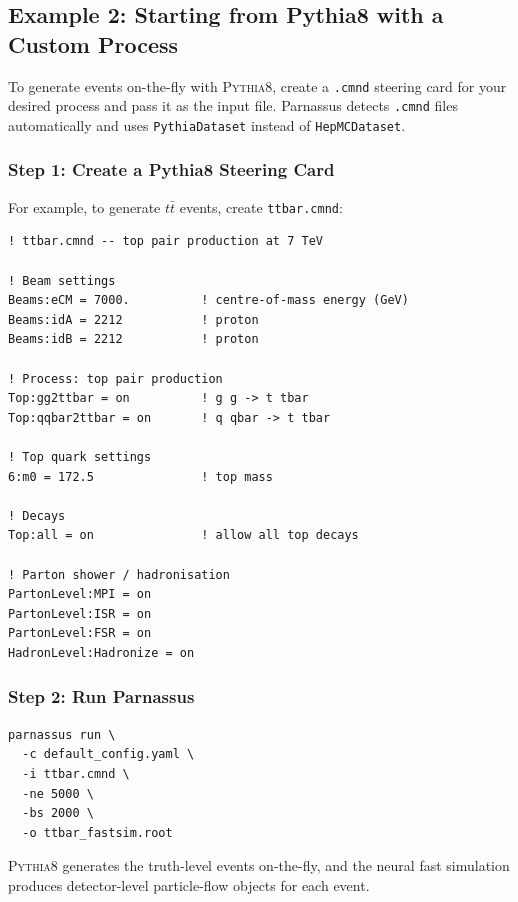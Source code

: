 \documentclass[11pt,a4paper]{article}
\begin{document}
\subsection{Example 2: Starting from Pythia8 with a Custom Process}

To generate events on-the-fly with \textsc{Pythia8}, create a \texttt{.cmnd} steering
card for your desired process and pass it as the input file. Parnassus detects
\texttt{.cmnd} files automatically and uses \texttt{PythiaDataset} instead of
\texttt{HepMCDataset}.

\subsubsection{Step 1: Create a Pythia8 Steering Card}

For example, to generate $t\bar{t}$ events, create \texttt{ttbar.cmnd}:

\begin{lstlisting}[style=cmnd,caption={Pythia8 steering card for $t\bar{t}$ production.},label=lst:ttbar]
! ttbar.cmnd -- top pair production at 7 TeV

! Beam settings
Beams:eCM = 7000.          ! centre-of-mass energy (GeV)
Beams:idA = 2212           ! proton
Beams:idB = 2212           ! proton

! Process: top pair production
Top:gg2ttbar = on          ! g g -> t tbar
Top:qqbar2ttbar = on       ! q qbar -> t tbar

! Top quark settings
6:m0 = 172.5               ! top mass

! Decays
Top:all = on               ! allow all top decays

! Parton shower / hadronisation
PartonLevel:MPI = on
PartonLevel:ISR = on
PartonLevel:FSR = on
HadronLevel:Hadronize = on
\end{lstlisting}

\subsubsection{Step 2: Run Parnassus}

\begin{lstlisting}[style=bash]
parnassus run \
  -c default_config.yaml \
  -i ttbar.cmnd \
  -ne 5000 \
  -bs 2000 \
  -o ttbar_fastsim.root
\end{lstlisting}

\textsc{Pythia8} generates the truth-level events on-the-fly, and the neural fast
simulation produces detector-level particle-flow objects for each event.
\end{document}
